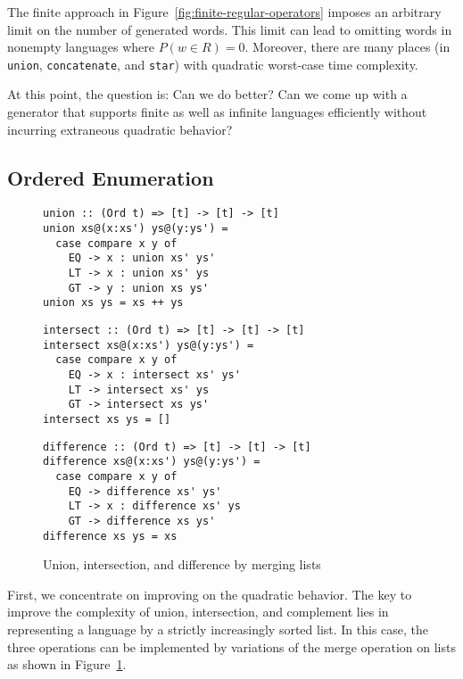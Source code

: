 The finite approach in Figure~\ref{fig:finite-regular-operators}
imposes an arbitrary limit on the number of generated words. This
limit can lead to omitting words in nonempty languages where $P (w\in
R) = 0$. Moreover, there are many places (in \texttt{union},
\texttt{concatenate}, and \texttt{star}) with quadratic worst-case
time complexity. 

At this point, the question is: Can we do better? Can we come up with
a generator that supports finite as well as infinite languages
efficiently without incurring extraneous quadratic behavior?


\subsection{Ordered Enumeration}
\label{sec:ordered-enumeration}
\begin{figure}[tp]
\begin{lstlisting}
union :: (Ord t) => [t] -> [t] -> [t]
union xs@(x:xs') ys@(y:ys') =
  case compare x y of
    EQ -> x : union xs' ys'
    LT -> x : union xs' ys
    GT -> y : union xs ys'
union xs ys = xs ++ ys
\end{lstlisting}

\begin{lstlisting}
intersect :: (Ord t) => [t] -> [t] -> [t]
intersect xs@(x:xs') ys@(y:ys') =
  case compare x y of
    EQ -> x : intersect xs' ys'
    LT -> intersect xs' ys
    GT -> intersect xs ys'
intersect xs ys = []
\end{lstlisting}

\begin{lstlisting}
difference :: (Ord t) => [t] -> [t] -> [t]
difference xs@(x:xs') ys@(y:ys') =
  case compare x y of
    EQ -> difference xs' ys'
    LT -> x : difference xs' ys
    GT -> difference xs ys'
difference xs ys = xs
\end{lstlisting}
  \caption{Union, intersection, and difference by merging lists}
  \label{fig:merging-lists}
\end{figure}

First, we concentrate on improving on the quadratic behavior. The key
to improve the complexity of union, intersection, and complement lies
in representing a language by a strictly increasingly sorted list.
In this case, the three operations can be implemented by variations of
the merge operation on lists as shown in
Figure~\ref{fig:merging-lists}.

